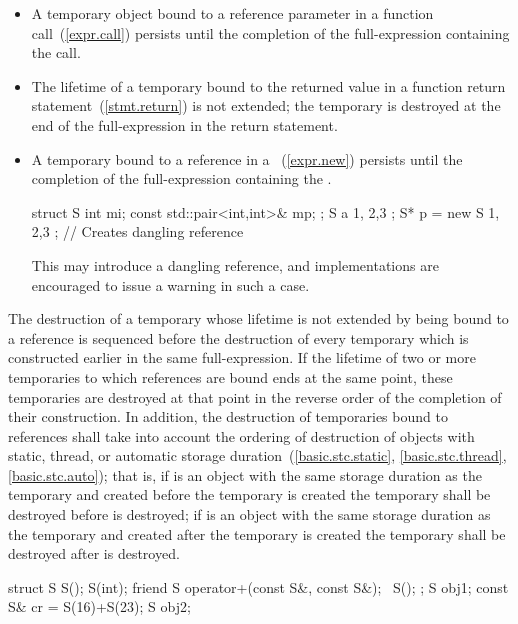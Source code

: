 \begin{itemize}
\item A temporary object bound to a reference parameter in a function call~(\ref{expr.call})
persists until the completion of the full-expression containing the call.

\item The lifetime of a temporary bound to the returned value in a function return statement~(\ref{stmt.return}) is not extended; the temporary is destroyed at the end of the full-expression in the return statement.

\item A temporary bound to a reference in a ~(\ref{expr.new}) persists until the completion of the full-expression containing the . \enterexample
\begin{codeblock}
struct S { int mi; const std::pair<int,int>& mp; };
S a { 1, {2,3} };
S* p = new S{ 1, {2,3} };   // Creates dangling reference
\end{codeblock}
\exitexample \enternote This may introduce a dangling reference, and implementations are encouraged to issue a warning in such a case. \exitnote
\end{itemize}

The destruction of a temporary whose lifetime is not extended by being
bound to a reference is sequenced before the destruction of every
temporary which is constructed earlier in the same full-expression.
If the lifetime of two or more temporaries to which references are bound ends
at the same point,
these temporaries are destroyed at that point in the reverse order of the
completion of their construction.
In addition, the destruction of temporaries bound to references shall
take into account the ordering of destruction of objects with static, thread, or
automatic storage duration~(\ref{basic.stc.static}, \ref{basic.stc.thread}, \ref{basic.stc.auto});
that is, if
is an object with the same storage duration as the temporary and
created before the temporary is created 
the temporary shall be destroyed before
is destroyed;
if
is an object with the same storage duration as the temporary and
created after the temporary is created
the temporary shall be destroyed after
is destroyed.
\enterexample

\begin{codeblock}
struct S {
  S();
  S(int);
  friend S operator+(const S&, const S&);
  ~S();
};
S obj1;
const S& cr = S(16)+S(23);
S obj2;
\end{codeblock}

